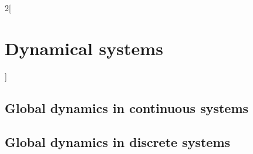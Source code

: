 \documentclass[../../../main_math.tex]{subfiles}
\begin{document}
\begin{multicols}{2}[\section{Dynamical systems}]
\begin{theorem}
    \begin{center}
      \begin{minipage}{0.45\linewidth}
        \centering
        
      \end{minipage}\hfill
      \begin{minipage}{0.45\linewidth}
        \centering
        
      \end{minipage}\hfill
      \label{DS_meven}
    \end{center}
  \end{theorem}
  \subsection{Global dynamics in continuous systems}
  \subsection{Global dynamics in discrete systems}
\end{multicols}
\end{document}
